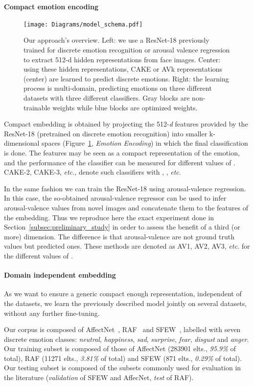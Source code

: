 \documentclass{bmvc2k}
\begin{document}
\paragraph{Compact emotion encoding}
\begin{figure}
    \centering
    \texttt{[image: Diagrams/model\_schema.pdf]}
    \caption{Our approach's overview. Left: we use a ResNet-18 previously trained for discrete emotion recognition or arousal valence regression to extract 512-d hidden representations from face images. Center: using these hidden representations, CAKE or AVk representations (center) are learned to predict discrete emotions. Right: the learning process is multi-domain, predicting emotions on three different datasets with three different classifiers. Gray blocks are non-trainable weights while blue blocks are optimized weights.}
    \label{fig:cross_arch}
\end{figure}
Compact embedding is obtained by projecting the 512-\textit{d} features provided by the ResNet-18 (pretrained on discrete emotion recognition) into smaller k-dimensional spaces (Figure~\ref{fig:cross_arch}, \textit{Emotion Encoding}) in which the final classification is done.
The  features may be seen as a compact representation of the emotion, and the performance of the classifier can be measured for different values of . CAKE-2, CAKE-3, \textit{etc.}, denote such classifiers with , , \textit{etc}.

In the same fashion we can train the ResNet-18 using arousal-valence regression. In this case, the so-obtained arousal-valence regressor can be used to infer arousal-valence values from novel images and concatenate them to the  features of the embedding. Thus we reproduce here the exact experiment done in Section~\ref{subsec:preliminary_study} in order to assess the benefit of a third (or more) dimension. The difference is that arousal-valence are not ground truth values but predicted ones. These methods are denoted as AV1, AV2, AV3, \textit{etc.} for the different values of .

\paragraph{Domain independent embedding}
As we want to ensure a generic compact enough representation, independent of the datasets, we learn the previously described model jointly on several datasets, without any further fine-tuning.

Our corpus is composed of AffectNet~\cite{mollahosseini_affectnet:_2017}, RAF~\cite{li_reliable_2017} and SFEW~\cite{dhall_static_2011}, labelled with seven discrete emotion classes: \textit{neutral}, \textit{happiness}, \textit{sad}, \textit{surprise}, \textit{fear}, \textit{disgust} and \textit{anger}. Our training subset is composed of those of AffectNet (283901 elts., \textit{95.9\%} of total), RAF (11271 elts., \textit{3.81\%} of total) and SFEW (871 elts., \textit{0.29\%} of total). Our testing subset is composed of the subsets commonly used for evaluation in the literature (\textit{validation} of SFEW and AffecNet, \textit{test} of RAF).
\end{document}
